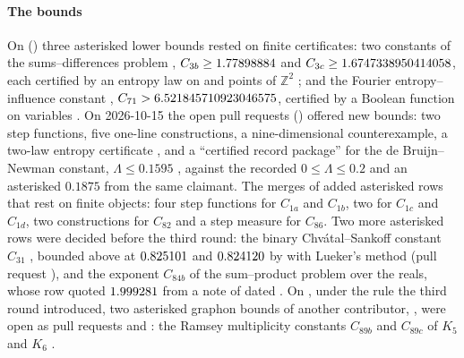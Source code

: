 \documentclass[preprint,11pt,authoryear,a4paper]{elsarticle}
\newcommand{\Z}{\mathbb{Z}}
\begin{document}
\paragraph{The bounds} On \MtRgBeforeCommit{} (\MtRgRuleDate) three asterisked lower bounds rested on finite certificates: two constants of the sums--differences problem \citep{KatzTao99}, $C_{3b} \ge 1.77898884$ and $C_{3c} \ge 1.6747338950414058$, each certified by an entropy law on \MtRgCbPoints{} and \MtRgCcPoints{} points of $\Z^2$ \citep{MosaicC3b,LinC3c}; and the Fourier entropy--influence constant \citep{FriedgutKalai96}, $C_{71} > 6.521845710923046575$, certified by a Boolean function on \MtRgFeiN{} variables \citep{NumaroC71}. On 2026-10-15 the open pull requests (\MtRqPrs) offered \MtRqRows{} new bounds: two step functions, five one-line constructions, a nine-dimensional counterexample, a two-law entropy certificate \citep{JaswalC3c}, and a ``certified record package'' for the de Bruijn--Newman constant, $\Lambda \le 0.1595$ \citep{MosaicLambda}, against the recorded $0 \le \Lambda \le 0.2$ \citep{RodgersTao20,PlattTrudgian21} and an asterisked $0.1875$ from the same claimant. The merges of \MtRgMergeDate{} added asterisked rows that rest on finite objects: four step functions for $C_{1a}$ and $C_{1b}$, two for $C_{1c}$ and $C_{1d}$, two constructions for $C_{82}$ and a step measure for $C_{86}$. Two more asterisked rows were decided before the third round: the binary Chv\'atal--Sankoff constant $C_{31}$ \citep{ChvatalSankoff75}, bounded above at $0.825101$ and $0.824120$ by \OcLuClaimant{} with Lueker's method \citep{Lueker09} (pull request \OcLuPr), and the exponent $C_{84b}$ of the sum--product problem \citep{ErdosSzemeredi83} over the reals, whose row quoted $1.999281$ from a note of \OcSpNoteAuthor{} dated \OcSpNoteDate. On \OcGnPosted, under the rule the third round introduced, two asterisked graphon bounds of another contributor, \OcGnClaimant, were open as pull requests \OcGnPrB{} and \OcGnPrC: the Ramsey multiplicity constants $C_{89b}$ and $C_{89c}$ of $K_5$ and $K_6$ \citep{Thomason89,PPSS22}.
\end{document}

